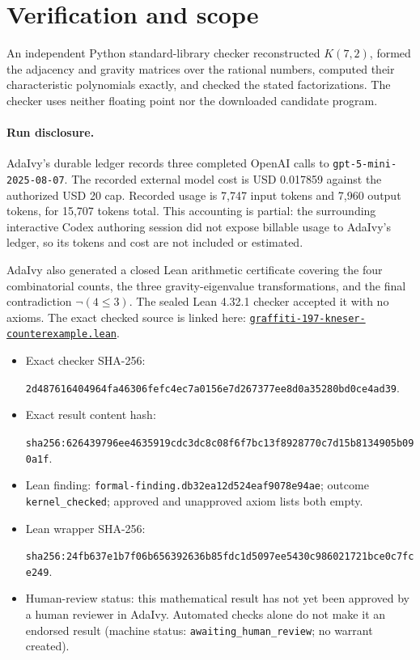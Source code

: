 \documentclass[11pt]{article}
\begin{document}
\section{Verification and scope}

An independent Python standard-library checker reconstructed $K(7,2)$, formed
the adjacency and gravity matrices over the rational numbers, computed their
characteristic polynomials exactly, and checked the stated factorizations.
The checker uses neither floating point nor the downloaded candidate program.

\paragraph{Run disclosure.}\mbox{}\par\noindent
AdaIvy's durable ledger records three completed OpenAI calls to
\nolinkurl{gpt-5-mini-2025-08-07}. The recorded external model cost is USD
0.017859 against the authorized USD 20 cap. Recorded usage is 7,747 input
tokens and 7,960 output tokens, for 15,707 tokens total. This
accounting is partial: the surrounding interactive Codex authoring session did
not expose billable usage to AdaIvy's ledger, so its tokens and cost are not
included or estimated.

AdaIvy also generated a closed Lean arithmetic certificate covering the four
combinatorial counts, the three gravity-eigenvalue transformations, and the
final contradiction $\neg(4\leq3)$. The sealed Lean 4.32.1 checker accepted it
with no axioms. The exact checked source is linked here:
\href{run:graffiti-197-kneser-counterexample.lean}%
{\nolinkurl{graffiti-197-kneser-counterexample.lean}}.

\begin{itemize}
\item Exact checker SHA-256:
\par{\scriptsize\texttt{2d487616404964fa46306fefc4ec7a0156e7d267377ee8d0a35280bd0ce4ad39}}.
\item Exact result content hash:
\par{\scriptsize\texttt{sha256:626439796ee4635919cdc3dc8c08f6f7bc13f8928770c7d15b8134905b090a1f}}.
\item Lean finding:
\texttt{formal-finding.db32ea12d524eaf9078e94ae}; outcome
\texttt{kernel\_checked}; approved and unapproved axiom lists both empty.
\item Lean wrapper SHA-256:
\par{\scriptsize\texttt{sha256:24fb637e1b7f06b656392636b85fdc1d5097ee5430c986021721bce0c7fce249}}.
\item Human-review status: this mathematical result has not yet been approved by
a human reviewer in AdaIvy. Automated checks alone do not make it an endorsed
result (machine status: \texttt{awaiting\_human\_review}; no warrant created).
\end{itemize}
\end{document}
